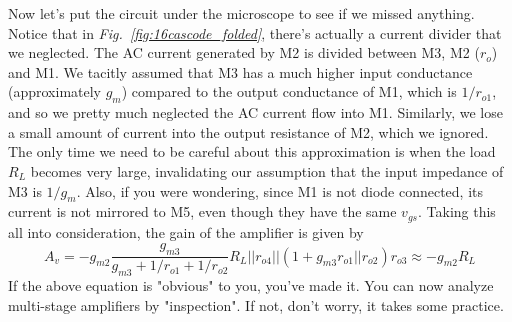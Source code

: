 Now let's put the circuit under the microscope to see if we missed anything.  Notice that in \emph{Fig.~\ref{fig:16cascode_folded}}, there's actually a current divider that we neglected.  The AC current generated by M2 is divided between M3, M2 ($r_o$) and M1.  We tacitly assumed that M3 has a much higher input conductance (approximately $g_m$) compared to the output conductance of M1, which is $1/r_{o1}$, and so we pretty much neglected the AC current flow into M1.  Similarly, we lose a small amount of current into the output resistance of M2, which we ignored.  The only time we need to be careful about this approximation is when the load $R_L$ becomes very large, invalidating our assumption that the input impedance of M3 is $1/g_m$.  Also, if you were wondering, since M1 is not diode connected, its current is not mirrored to M5, even though they have the same $v_{gs}$.  Taking this all into consideration, the gain of the amplifier is given by
    \begin{equation}
        A_v = - g_{m2} \frac{g_{m3}}{g_{m3} + 1/r_{o1} + 1/r_{o2}} R_L || r_{o4} || (1 + g_{m3} r_{o1}||r_{o2}) r_{o3} \approx -g_{m2} R_L
    \end{equation} 
If the above equation is "obvious" to you, you've made it.  You can now analyze multi-stage amplifiers by "inspection".  If not, don't worry, it takes some practice.
%
%
%
%
% 
%
%
%
%
%
%
% 
